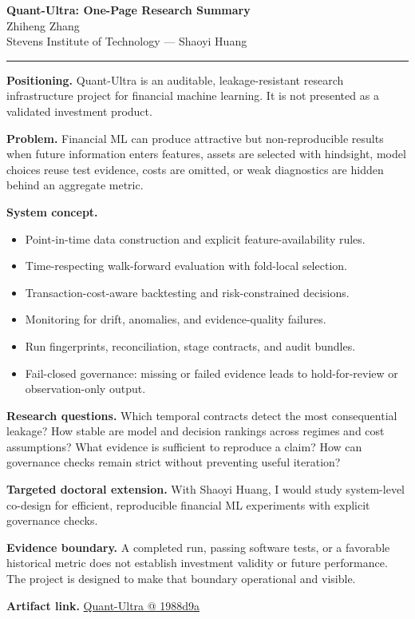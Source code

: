 \documentclass[11pt]{article}
\makeatletter
\newcommand{\ApplicantName}{Zhiheng Zhang}
\newcommand{\ApplicantGitHub}{\href{https://github.com/zhiheng-zhang-Mera/Quant-Ultra/tree/1988d9a8530da91a8158de864d098ea869098923}{Quant-Ultra @ 1988d9a}}
\makeatother
\begin{document}
\begin{center}
{\LARGE\bfseries Quant-Ultra: One-Page Research Summary}\\[0.25em]
{\large \ApplicantName}\\
Stevens Institute of Technology --- Shaoyi Huang
\end{center}
\vspace{0.35em}\hrule\vspace{0.65em}

\textbf{Positioning.} Quant-Ultra is an auditable, leakage-resistant research infrastructure project for financial machine learning. It is not presented as a validated investment product.

\textbf{Problem.} Financial ML can produce attractive but non-reproducible results when future information enters features, assets are selected with hindsight, model choices reuse test evidence, costs are omitted, or weak diagnostics are hidden behind an aggregate metric.

\textbf{System concept.}
\begin{itemize}
\item Point-in-time data construction and explicit feature-availability rules.
\item Time-respecting walk-forward evaluation with fold-local selection.
\item Transaction-cost-aware backtesting and risk-constrained decisions.
\item Monitoring for drift, anomalies, and evidence-quality failures.
\item Run fingerprints, reconciliation, stage contracts, and audit bundles.
\item Fail-closed governance: missing or failed evidence leads to hold-for-review or observation-only output.
\end{itemize}

\textbf{Research questions.} Which temporal contracts detect the most consequential leakage? How stable are model and decision rankings across regimes and cost assumptions? What evidence is sufficient to reproduce a claim? How can governance checks remain strict without preventing useful iteration?

\textbf{Targeted doctoral extension.} With Shaoyi Huang, I would study system-level co-design for efficient, reproducible financial ML experiments with explicit governance checks.

\textbf{Evidence boundary.} A completed run, passing software tests, or a favorable historical metric does not establish investment validity or future performance. The project is designed to make that boundary operational and visible.

\textbf{Artifact link.} \ApplicantGitHub
\end{document}

